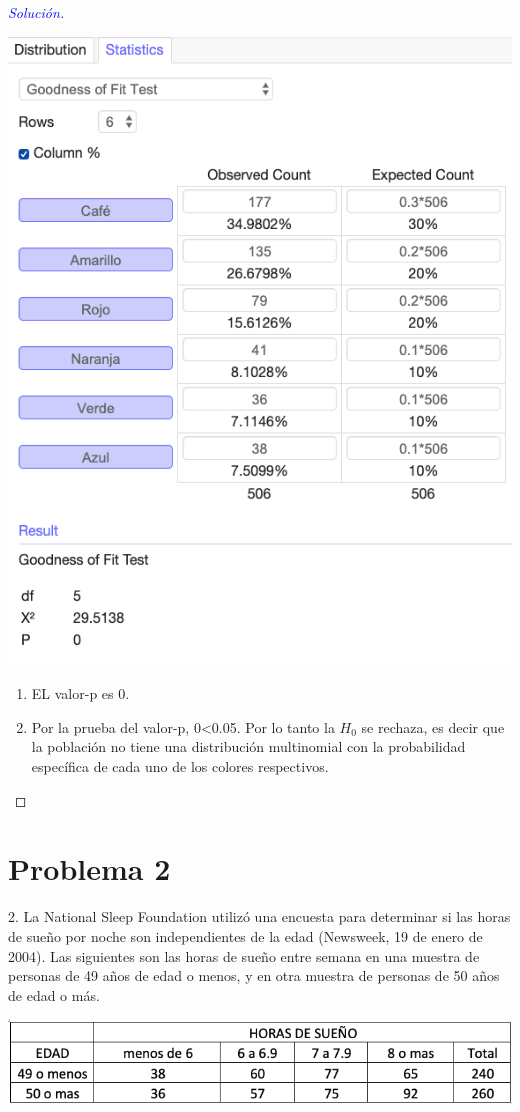 \documentclass[a4paper,12pt]{article}
\newenvironment{solution}
  {\renewcommand\qedsymbol{$\square$}\begin{proof}[\textcolor{blue}{Solución}]}
  {\end{proof}}
\begin{document}
\begin{solution}
\begin{center}
    \includegraphics[scale=0.5]{images/Screen Shot 2021-05-11 at 15.53.11.png}
\end{center}
\begin{enumerate}
    \item EL valor-p es 0. 
    \item Por la prueba del valor-p, 0<0.05. Por lo tanto la $H_0$ se rechaza, es decir que la población no tiene una distribución multinomial con la probabilidad específica de cada uno de los colores respectivos.
\end{enumerate}
\end{solution}
\section{Problema 2}
2.	La National Sleep Foundation utilizó una encuesta para determinar si las horas de sueño por noche son independientes de la edad (Newsweek, 19 de enero de 2004). Las siguientes son las horas de sueño entre semana en una muestra de personas de 49 años de edad o menos, y en otra muestra de personas de 50 años de edad o más.
\begin{center}
    \includegraphics[scale=0.5]{images/Screen Shot 2021-05-11 at 16.01.23.png}
\end{center}
\end{document}
